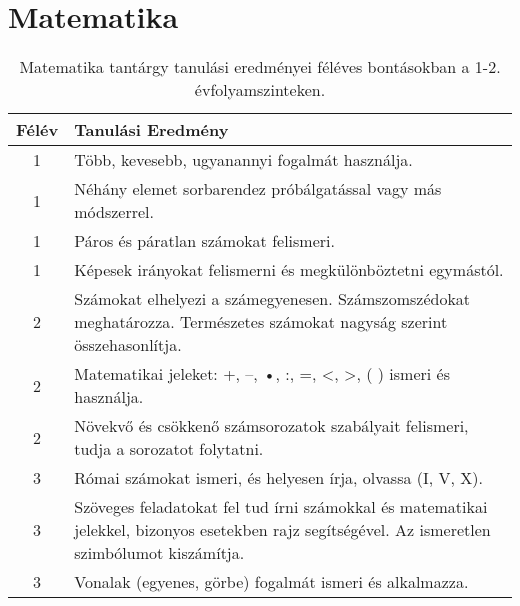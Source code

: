            \clearpage

        \section{Matematika}

       
           \begin{longtable}{c | p{12cm} }
            \caption[Matematika 1-2.]{Matematika tantárgy tanulási eredményei féléves bontásokban a 1-2. évfolyamszinteken. }  \\

            \textbf{Félév} & \textbf{Tanulási Eredmény} \\
            \hline
            \endhead
                                
                                      
                                
                                          1 &  Több, kevesebb, ugyanannyi fogalmát használja. \\ \hline
                                          1 &  Néhány elemet sorbarendez próbálgatással vagy más módszerrel. \\ \hline
                                          1 &  Páros és páratlan számokat felismeri. \\ \hline
                                          1 &  Képesek irányokat felismerni és megkülönböztetni egymástól. \\ \hline
                                      
                                
                                          2 &  Számokat elhelyezi a számegyenesen. Számszomszédokat meghatározza. Természetes számokat nagyság szerint összehasonlítja. \\ \hline
                                          2 &  Matematikai jeleket: +, –, •, :, =, <, >, ( ) ismeri és használja. \\ \hline
                                          2 &  Növekvő és csökkenő számsorozatok szabályait felismeri, tudja a sorozatot folytatni. \\ \hline
                                      
                                
                                          3 &  Római számokat ismeri, és helyesen írja, olvassa (I, V, X). \\ \hline
                                          3 &  Szöveges feladatokat fel tud írni számokkal és matematikai jelekkel, bizonyos esetekben rajz segítségével. Az ismeretlen szimbólumot kiszámítja. \\ \hline
                                          3 &  Vonalak (egyenes, görbe) fogalmát ismeri és alkalmazza. \\ \hline
                                      

\end{longtable}
